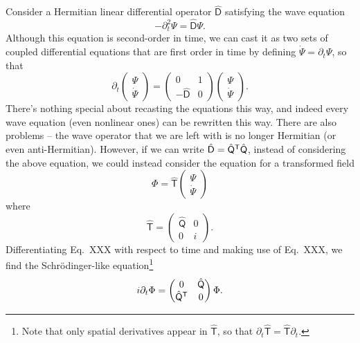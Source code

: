 Consider a Hermitian linear differential operator $\hat{\mathsf{D}}$ satisfying the wave equation
%
\begin{equation}
  -\partial_{t}^{2}\Psi = \hat{\mathsf{D}}\Psi.
\end{equation}
%
Although this equation is second-order in time, we can cast it as two sets of coupled differential equations that are first order in time by defining $\dot{\Psi} = \partial_{t}\Psi$, so that
%
\begin{equation}
  \partial_{t}
  \begin{pmatrix}
    \Psi \\
    \dot{\Psi}
  \end{pmatrix}
  =
  \begin{pmatrix}
    0 & 1\\
    -\hat{\mathsf{D}} & 0
  \end{pmatrix}
  \begin{pmatrix}
    \Psi \\
    \dot{\Psi}
  \end{pmatrix}.
\end{equation}
%
There's nothing special about recasting the equations this way, and indeed every wave equation (even nonlinear ones) can be rewritten this way.
There are also problems -- the wave operator that we are left with is no longer Hermitian (or even anti-Hermitian).
However, if we can write $\hat{\mathsf{D}} = \hat{\mathsf{Q}}^\mathsf{T}\hat{\mathsf{Q}}$, instead of considering the above equation, we could instead consider the equation for a transformed field
\begin{equation}
  \Phi = \hat{\mathsf{T}}
  \begin{pmatrix}
    \Psi\\
    \dot{\Psi}
  \end{pmatrix}
\end{equation}
%
where
%
\begin{equation}
  \hat{\mathsf{T}} =
  \begin{pmatrix}
    \hat{\mathsf{Q}} & 0\\
    0 & i
  \end{pmatrix}.
\end{equation}
%
Differentiating Eq.~XXX with respect to time and making use of Eq.~XXX, we find the Schr\"{o}dinger-like equation\footnote{Note that only spatial derivatives appear in $\hat{\mathsf{T}}$, so that $\partial_{t}\hat{\mathsf{T}} = \hat{\mathsf{T}}\partial_{t}$.}
%
\begin{equation}
  i\partial_{t}\Phi =
  \begin{pmatrix}
    0 & \hat{\mathsf{Q}}\\
    \hat{\mathsf{Q}}^\mathsf{T} & 0
  \end{pmatrix}
  \Phi.
\end{equation}


